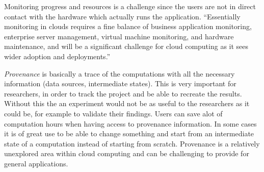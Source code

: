 

Monitoring progress and resources is a challenge since the users are
not in direct contact with the hardware which actually runs the
application. ``Essentially monitoring in clouds requires a fine
balance of business application monitoring, enterprise server
management, virtual machine monitoring, and hardware maintenance, and
will be a significant challenge for cloud computing as it sees wider
adoption and deployments.''\citep{foster:2008}



\emph{Provenance} is basically a trace of the computations with all
the necessary information (data sources, intermediate states). This is
very important for researchers, in order to track the project and be
able to recreate the results. Without this the an experiment would not
be as useful to the researchers as it could be, for example to
validate their findings. Users can save alot of computation hours when
having access to provenance information. In some cases it is of great
use to be able to change something and start from an intermediate
state of a computation instead of starting from scratch. Provenance is
a relatively unexplored area within cloud computing and can be
challenging to provide for general applications.




